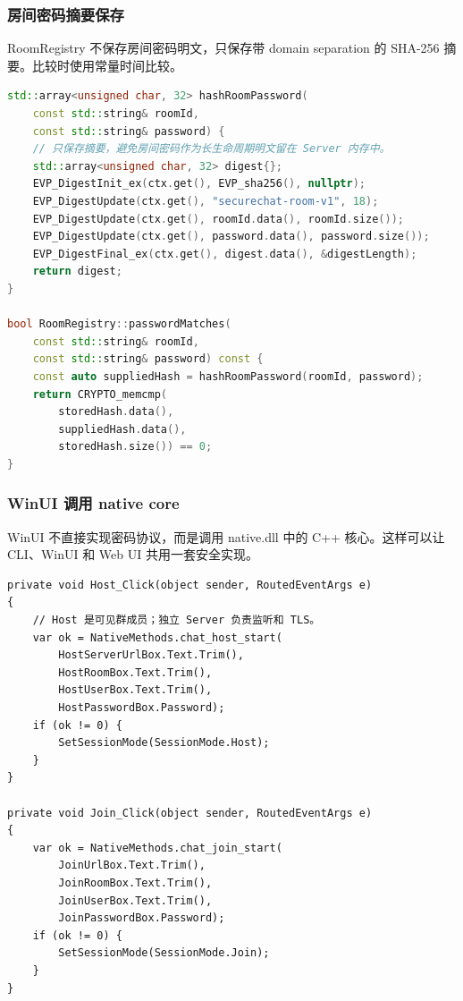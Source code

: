 \documentclass[UTF8,a4paper,12pt]{ctexart}
\begin{document}
\subsubsection{房间密码摘要保存}

RoomRegistry 不保存房间密码明文，只保存带 domain separation 的 SHA-256 摘要。比较时使用常量时间比较。

\begin{lstlisting}[language=C++,caption={room\_registry.cpp：房间密码摘要}]
std::array<unsigned char, 32> hashRoomPassword(
    const std::string& roomId,
    const std::string& password) {
    // 只保存摘要，避免房间密码作为长生命周期明文留在 Server 内存中。
    std::array<unsigned char, 32> digest{};
    EVP_DigestInit_ex(ctx.get(), EVP_sha256(), nullptr);
    EVP_DigestUpdate(ctx.get(), "securechat-room-v1", 18);
    EVP_DigestUpdate(ctx.get(), roomId.data(), roomId.size());
    EVP_DigestUpdate(ctx.get(), password.data(), password.size());
    EVP_DigestFinal_ex(ctx.get(), digest.data(), &digestLength);
    return digest;
}

bool RoomRegistry::passwordMatches(
    const std::string& roomId,
    const std::string& password) const {
    const auto suppliedHash = hashRoomPassword(roomId, password);
    return CRYPTO_memcmp(
        storedHash.data(),
        suppliedHash.data(),
        storedHash.size()) == 0;
}
\end{lstlisting}

\subsubsection{WinUI 调用 native core}

WinUI 不直接实现密码协议，而是调用 native.dll 中的 C++ 核心。这样可以让 CLI、WinUI 和 Web UI 共用一套安全实现。

\begin{lstlisting}[language={[Sharp]C},caption={MainWindow.xaml.cs：Host 和 Join 入口}]
private void Host_Click(object sender, RoutedEventArgs e)
{
    // Host 是可见群成员；独立 Server 负责监听和 TLS。
    var ok = NativeMethods.chat_host_start(
        HostServerUrlBox.Text.Trim(),
        HostRoomBox.Text.Trim(),
        HostUserBox.Text.Trim(),
        HostPasswordBox.Password);
    if (ok != 0) {
        SetSessionMode(SessionMode.Host);
    }
}

private void Join_Click(object sender, RoutedEventArgs e)
{
    var ok = NativeMethods.chat_join_start(
        JoinUrlBox.Text.Trim(),
        JoinRoomBox.Text.Trim(),
        JoinUserBox.Text.Trim(),
        JoinPasswordBox.Password);
    if (ok != 0) {
        SetSessionMode(SessionMode.Join);
    }
}
\end{lstlisting}
\end{document}
